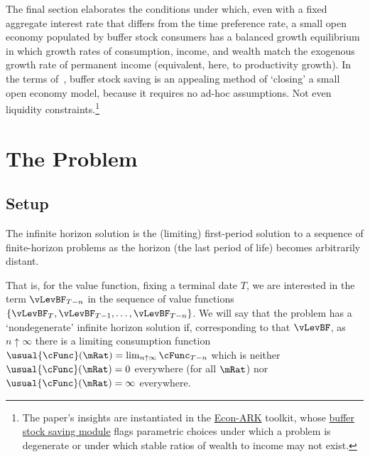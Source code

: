 \documentclass[BufferStockTheory]{subfiles}
\begin{document}
The final section elaborates the conditions under which, even with a fixed aggregate interest rate that differs from the time preference rate, a small open economy populated by buffer stock consumers has a balanced growth equilibrium in which growth rates of consumption, income, and wealth match the exogenous growth rate of permanent income (equivalent, here, to productivity growth). In the terms of~\cite{schmitt2003closing}, buffer stock saving is an appealing method of `closing' a small open economy model, because it requires no ad-hoc assumptions.  Not even liquidity constraints.\footnote{The paper's insights are instantiated in the \href{https://econ-ark.org}{Econ-ARK} toolkit, whose \href{https://hark.readthedocs.io/en/stable/reference/ConsumptionSaving/ConsIndShockModel.html}{buffer stock saving module} flags parametric choices under which a problem is degenerate or under which stable ratios of wealth to income may not exist.}


\hypertarget{The-Problem}{}

\section{The Problem}

\subsection{Setup}\label{subsec:Setup}

The infinite horizon solution is the (limiting) first-period solution to a sequence of finite-horizon problems as the horizon (the last period of life) becomes arbitrarily distant.

That is, for the value function, fixing a terminal date $T$,  we are interested in the term $\vLevBF_{T-n}$ in the sequence of value functions $\{\vLevBF_{T},\vLevBF_{T-1},\ldots,\vLevBF_{T-n}\}$.  We will say that the problem has a `nondegenerate' infinite horizon solution if, corresponding to that $\vLevBF$, as $n \uparrow \infty$ there is a limiting consumption function $\usual{\cFunc}(\mRat) = \lim_{n \uparrow \infty} \cFunc_{T-n}$ which is neither $\usual{\cFunc}(\mRat)=0$ everywhere (for all $\mRat$) nor $\usual{\cFunc}(\mRat)=\infty$ everywhere.
\end{document}

